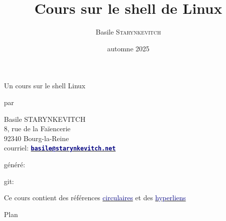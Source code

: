 \documentclass[lualatex,11pt,a4paper,svgnames,french]{beamer}
\title{Cours sur le shell de Linux}
\author{Basile \textsc{Starynkevitch}}
\date{automne 2025}
\newcommand{\clbemail}[1]{{\href{mailto:#1}{\texttt{\textbf{\textcolor{Navy}{#1}}}}}}
\begin{document}
\begin{frame}
\titlepage
\end{frame}

\begin{frame}{Un cours sur le shell Linux}

  par

  \begin{center}Basile STARYNKEVITCH \\
  8, rue de la Faïencerie \\
  92340 Bourg-la-Reine \\
  courriel: \clbemail{basile@starynkevitch.net}
  \end{center}
  \bigskip
  
  généré: \textit{\clbdate} 

  \bigskip
  
  git: \texttt{\clbgitid}

  \begin{center}
    Ce cours contient des références
    \href{https://fr.wikipedia.org/wiki/Raisonnement_circulaire}{\textcolor{Navy}{circulaires}}
    et des
    \href{https://fr.wikipedia.org/wiki/Hyperlien}{\textcolor{Navy}{hyperliens}}
  \end{center}
\end{frame}

\begin{frame}{Plan}
  \tableofcontents
\end{frame}

\end{document}
